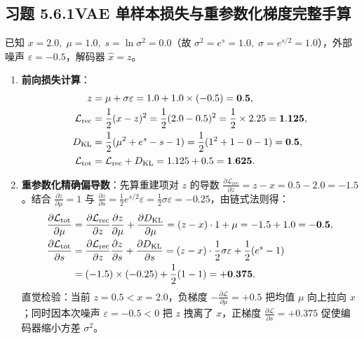 \subsection*{习题 5.6.1\quad VAE 单样本损失与重参数化梯度完整手算}
已知 $x = 2.0,\; \mu = 1.0,\; s = \ln \sigma^2 = 0.0$（故 $\sigma^2 = e^s = 1.0,\; \sigma = e^{s/2} = 1.0$），外部噪声 $\varepsilon = -0.5$，解码器 $\hat{x} = z$。
\begin{enumerate}[label=(\alph*), leftmargin=1.8em]
  \item \textbf{前向损失计算}：
  \begin{align*}
    z &= \mu + \sigma \varepsilon = 1.0 + 1.0 \times (-0.5) = \mathbf{0.5}, \\
    \mathcal{L}_{\text{rec}} &= \frac{1}{2}(x - z)^2 = \frac{1}{2}(2.0 - 0.5)^2 = \frac{1}{2}\times 2.25 = \mathbf{1.125}, \\
    D_{\mathrm{KL}} &= \frac{1}{2}(\mu^2 + e^s - s - 1) = \frac{1}{2}(1^2 + 1 - 0 - 1) = \mathbf{0.5}, \\
    \mathcal{L}_{\text{tot}} &= \mathcal{L}_{\text{rec}} + D_{\mathrm{KL}} = 1.125 + 0.5 = \mathbf{1.625}.
  \end{align*}

  \item \textbf{重参数化精确偏导数}：先算重建项对 $z$ 的导数 $\frac{\partial \mathcal{L}_{\text{rec}}}{\partial z} = z - x = 0.5 - 2.0 = -1.5$。结合 $\frac{\partial z}{\partial \mu} = 1$ 与 $\frac{\partial z}{\partial s} = \frac{1}{2} e^{s/2}\varepsilon = \frac{1}{2}\sigma\varepsilon = -0.25$，由链式法则得：
  \begin{align*}
    \frac{\partial \mathcal{L}_{\text{tot}}}{\partial \mu}
    &= \frac{\partial \mathcal{L}_{\text{rec}}}{\partial z}\frac{\partial z}{\partial \mu} + \frac{\partial D_{\mathrm{KL}}}{\partial \mu}
     = (z - x)\cdot 1 + \mu = -1.5 + 1.0 = \mathbf{-0.5}, \\
    \frac{\partial \mathcal{L}_{\text{tot}}}{\partial s}
    &= \frac{\partial \mathcal{L}_{\text{rec}}}{\partial z}\frac{\partial z}{\partial s} + \frac{\partial D_{\mathrm{KL}}}{\partial s}
     = (z - x)\cdot\frac{1}{2}\sigma\varepsilon + \frac{1}{2}(e^s - 1) \\
    &= (-1.5)\times(-0.25) + \frac{1}{2}(1 - 1) = \mathbf{+0.375}.
  \end{align*}
  直觉检验：当前 $z = 0.5 < x = 2.0$，负梯度 $-\frac{\partial \mathcal{L}}{\partial \mu} = +0.5$ 把均值 $\mu$ 向上拉向 $x$；同时因本次噪声 $\varepsilon = -0.5 < 0$ 把 $z$ 拽离了 $x$，正梯度 $\frac{\partial \mathcal{L}}{\partial s} = +0.375$ 促使编码器缩小方差 $\sigma^2$。
\end{enumerate}

